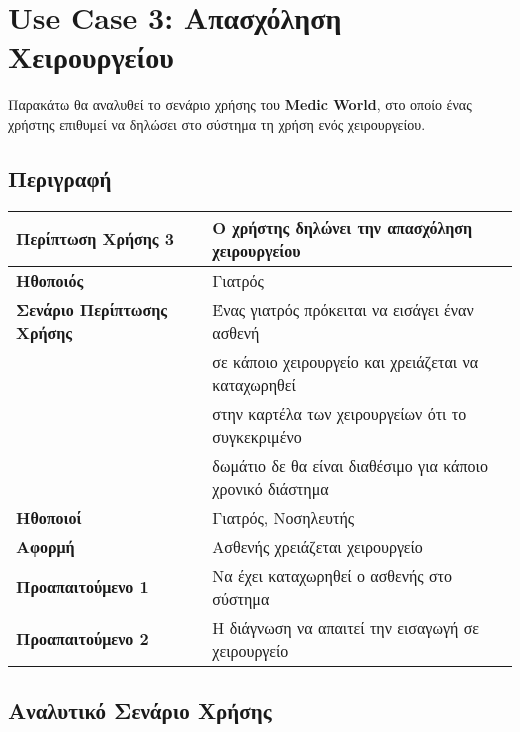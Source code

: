 \documentclass{article}
\newcommand\T{\rule{0pt}{2.6ex}}       %
\newcommand\B{\rule[-1.2ex]{0pt}{0pt}}
\begin{document}
 \section{Use Case 3: Απασχόληση Χειρουργείου}
 
 Παρακάτω θα αναλυθεί το σενάριο χρήσης του \textbf{Medic World}, στο οποίο ένας χρήστης επιθυμεί να δηλώσει στο σύστημα τη χρήση ενός χειρουργείου.

\subsection{Περιγραφή}

\begin{center}
     \begin{tabular}{|l|l|}
     \hline
      \textbf{Περίπτωση Χρήσης 3} & Ο χρήστης δηλώνει την απασχόληση χειρουργείου \T\B \\ 
      \hline
      \textbf{Ηθοποιός} & Γιατρός \T\B \\
      \hline
      \textbf{Σενάριο Περίπτωσης Χρήσης} & Ένας γιατρός πρόκειται να εισάγει έναν ασθενή \T \\& σε κάποιο χειρουργείο και χρειάζεται να καταχωρηθεί\\& στην καρτέλα των χειρουργείων ότι το συγκεκριμένο\\& δωμάτιο δε θα είναι διαθέσιμο για κάποιο χρονικό διάστημα \B \\
      \hline
      \textbf{Ηθοποιοί} & Γιατρός, Νοσηλευτής \T\B \\
      \hline
      \textbf{Αφορμή} & Ασθενής χρειάζεται χειρουργείο \T\B \\
      \hline
      \textbf{Προαπαιτούμενο 1} & Να έχει καταχωρηθεί ο ασθενής στο σύστημα \T\B \\
      \hline
      \textbf{Προαπαιτούμενο 2} & Η διάγνωση να απαιτεί την εισαγωγή σε χειρουργείο \T\B \\
      \hline
     \end{tabular}
 \end{center}
 
   \subsection{Αναλυτικό Σενάριο Χρήσης}
 
\end{document}
